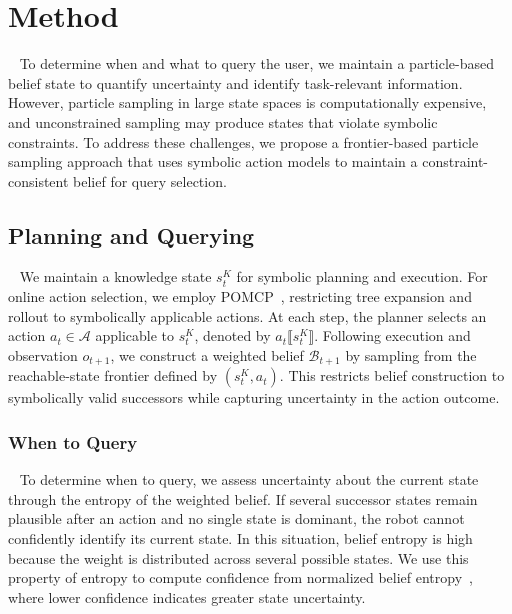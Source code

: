 
\section{Method}~\label{method:method}
To determine when and what to query the user, we maintain a particle-based belief state to quantify uncertainty and identify task-relevant information. However, particle sampling in large state spaces is computationally expensive, and unconstrained sampling may produce states that violate symbolic constraints. To address these challenges, we propose a frontier-based particle sampling approach that uses symbolic action models to maintain a constraint-consistent belief for query selection.

\subsection{Planning and Querying}~\label{method:overview}\label{method:planning}\label{method:PM}
We maintain a knowledge state $s_t^{K}$ for symbolic planning and execution. For online action selection, we employ POMCP~\cite{silver2010monte}, restricting tree expansion and rollout to symbolically applicable actions. At each step, the planner selects an action $a_t\in\mathcal{A}$ applicable to $s_t^{K}$, denoted by $a_t\llbracket s_t^{K}\rrbracket$. Following execution and observation $o_{t+1}$, we construct a weighted belief $\mathcal{B}_{t+1}$ by sampling from the reachable-state frontier defined by $(s_t^{K},a_t)$. This restricts belief construction to symbolically valid successors while capturing uncertainty in the action outcome.

\subsubsection{When to Query}~\label{method:when}
To determine when to query, we assess uncertainty about the current state through the entropy of the weighted belief. If several successor states remain plausible after an action and no single state is dominant, the robot cannot confidently identify its current state. In this situation, belief entropy is high because the weight is distributed across several possible states. We use this property of entropy to compute confidence from normalized belief entropy~\cite{qu2023stochastic}, where lower confidence indicates greater state uncertainty.

